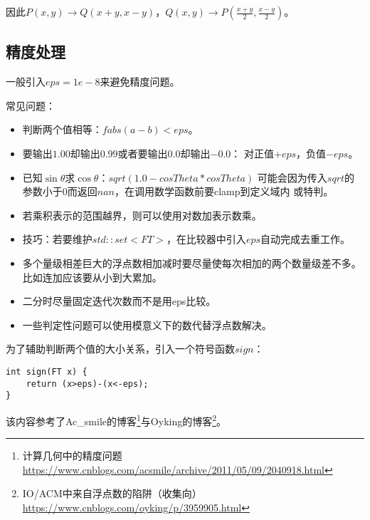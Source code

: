 因此$P(x,y)\rightarrow Q(x+y,x-y)$，$Q(x,y)
\rightarrow P(\frac{x+y}{2},\frac{x-y}{2})$。
\subsection{精度处理}
一般引入$eps=1e-8$来避免精度问题。

常见问题：
\begin{itemize}
    \item 判断两个值相等：$fabs(a-b)<eps$。
    \item 要输出$1.00$却输出$0.99$或者要输出$0.0$却输出$-0.0$：
        对正值$+eps$，负值$-eps$。
    \item 已知$\sin \theta$求$\cos \theta$：$sqrt(1.0-cosTheta*cosTheta)$
    可能会因为传入$sqrt$的参数小于0而返回$nan$，在调用数学函数前要clamp到定义域内
    或特判。
    \item 若乘积表示的范围越界，则可以使用对数加表示数乘。
    \item 技巧：若要维护$std::set<FT>$，在比较器中引入$eps$自动完成去重工作。
    \item 多个量级相差巨大的浮点数相加减时要尽量使每次相加的两个数量级差不多。
    比如连加应该要从小到大累加。
    \item 二分时尽量固定迭代次数而不是用eps比较。
    \item 一些判定性问题可以使用模意义下的数代替浮点数解决。
\end{itemize}

为了辅助判断两个值的大小关系，引入一个符号函数$sign$：
\begin{lstlisting}
int sign(FT x) {
    return (x>eps)-(x<-eps);
}
\end{lstlisting}

该内容参考了Ac\_smile的博客\footnote{计算几何中的精度问题\\
    \url{https://www.cnblogs.com/acsmile/archive/2011/05/09/2040918.html}
}与Oyking的博客\footnote{
    IO/ACM中来自浮点数的陷阱（收集向）
    \url{https://www.cnblogs.com/oyking/p/3959905.html}
}。
